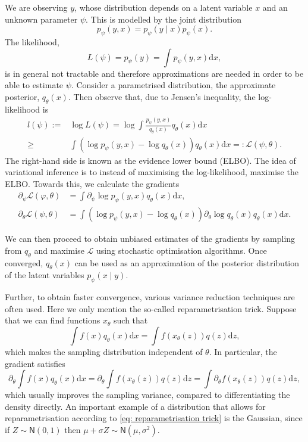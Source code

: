 \documentclass[11pt]{article}
\def\pp{\partial}
\newcommand{\pa}[1]{\left(#1\right)}
\def\dd{\ensuremath{\mathrm{d}}}
\begin{document}
We are observing $y$, whose distribution depends on a latent variable $x$ and an unknown parameter $\psi$. This is modelled by the joint distribution
$$
p_\psi(y,x) = p_\psi(y\mid x)p_\psi(x).
$$
The likelihood,
$$
    L(\psi)=p_\psi(y) = \int p_\psi(y,x)\dd x,
$$
is in general not tractable and therefore approximations are needed in order to be able to estimate $\psi$.
Consider a parametrised distribution, the approximate posterior, $q_\theta(x)$. Then observe that, due to Jensen's inequality, the log-likelihood is
\begin{align*}
    l(\psi):=&\log L(\psi) = \log \int \frac{p_\psi(y,x)}{q_\theta(x)} q_\theta(x)\dd x  \\
    \geq &\int \pa{\log p_\psi(y,x) - \log q_\theta(x)}q_\theta(x)\dd x=:\mathcal L(\psi,\theta).
\end{align*}
The right-hand side is known as the evidence lower bound (ELBO). The idea of variational inference is to instead of maximising the log-likelihood, maximise the ELBO. Towards this, we calculate the gradients
\begin{align*}
    \partial_\psi \mathcal L(\varphi,\theta) &= \int \partial_\psi \log p_\psi(y,x)q_\theta(x) \dd x ,\\
    \partial_\theta \mathcal L(\psi,\theta) &=  \int (\log p_\psi(y,x) - \log q_\theta(x))\partial_\theta \log q_\theta(x)  q_\theta(x)   \dd x.
\end{align*}

We can then proceed to obtain unbiased estimates of the gradients by sampling from $q_\theta$ and maximise $\mathcal L$ using stochastic optimisation algorithms. Once converged,  $q_\theta(x)$ can be used as an approximation of the posterior distribution of the latent variables $p_\psi(x\mid y)$.

Further, to obtain faster convergence, various variance reduction techniques are often used. Here we only mention the so-called reparametrisation trick. Suppose that we can find functions $x_\theta$ such that
\begin{equation}\label{eq: reparametrisation trick}
    \int f(x) q_\theta(x)\dd x = \int f(x_\theta(z))q(z)\dd z,
\end{equation}
which makes the sampling distribution independent of $\theta$. In particular, the gradient satisfies
$$
    \partial_\theta \int f(x) q_\theta(x)\dd x = \partial_\theta \int f(x_\theta(z))q(z)\dd z = \int \pp_\theta f(x_\theta(z))q(z)\dd z,
$$
which usually improves the sampling variance, compared to differentiating the density directly. An important example of a distribution that allows for reparametrisation according to \eqref{eq: reparametrisation trick} is the Gaussian, since if $Z\sim \mathsf N(0,1)$ then $\mu + \sigma Z\sim \mathsf N (\mu,\sigma^2)$.
\end{document}
